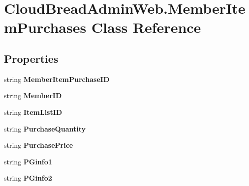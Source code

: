 \hypertarget{a00141}{}\section{Cloud\+Bread\+Admin\+Web.\+Member\+Item\+Purchases Class Reference}
\label{a00141}
\subsection*{Properties}
\begin{DoxyCompactItemize}
\item 
string {\bfseries Member\+Item\+Purchase\+ID}\hypertarget{a00141_a1218527c5446b141fbac8ad4517527c9}{}\label{a00141_a1218527c5446b141fbac8ad4517527c9}

\item 
string {\bfseries Member\+ID}\hypertarget{a00141_a06b5fa87ef6dd4464243e8cf48a8aee6}{}\label{a00141_a06b5fa87ef6dd4464243e8cf48a8aee6}

\item 
string {\bfseries Item\+List\+ID}\hypertarget{a00141_a2b39e997d4686829c0e2b4f80cef5e45}{}\label{a00141_a2b39e997d4686829c0e2b4f80cef5e45}

\item 
string {\bfseries Purchase\+Quantity}\hypertarget{a00141_aa10cdb349c48721f060d950ef673d049}{}\label{a00141_aa10cdb349c48721f060d950ef673d049}

\item 
string {\bfseries Purchase\+Price}\hypertarget{a00141_a4a90616da6a4bdf22ea9f6fc0bb32762}{}\label{a00141_a4a90616da6a4bdf22ea9f6fc0bb32762}

\item 
string {\bfseries P\+Ginfo1}\hypertarget{a00141_a4c9b08ee78488474eb1f821a7261f10b}{}\label{a00141_a4c9b08ee78488474eb1f821a7261f10b}

\item 
string {\bfseries P\+Ginfo2}\hypertarget{a00141_ae950765c3041d636908f9a00e98706f6}{}\label{a00141_ae950765c3041d636908f9a00e98706f6}


\end{DoxyCompactItemize}
